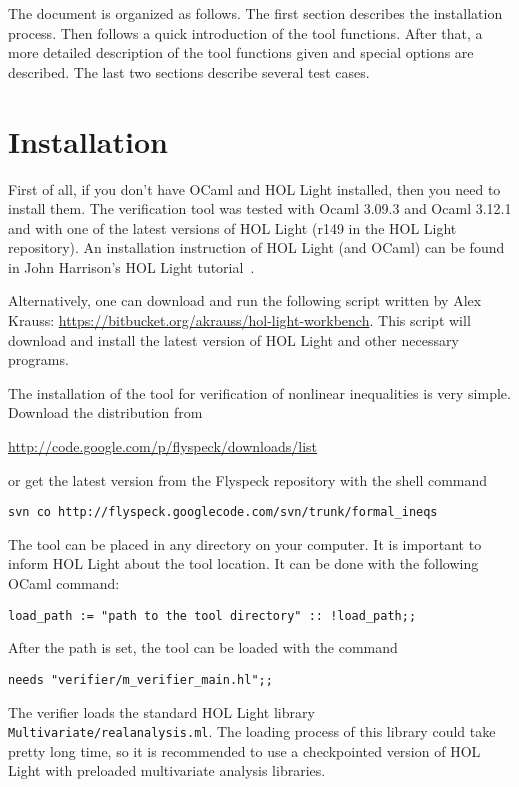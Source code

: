 \documentclass[a4paper]{article}
\begin{document}
The document is organized as follows. The first section describes the installation process. Then follows a quick introduction of the tool functions. After that, a more detailed description of the tool functions given and special options are described. The last two sections describe several test cases.


\section{Installation}
First of all, if you don't have OCaml and HOL Light installed, then you need to install them. The verification tool was tested with Ocaml 3.09.3 and Ocaml 3.12.1 and with one of the latest versions of HOL Light (r149 in the HOL Light repository).  An installation instruction of HOL Light (and OCaml) can be found in John Harrison's HOL Light tutorial~\cite{HOL-tutorial}.

Alternatively, one can download and run the following script written by Alex Krauss: \url{https://bitbucket.org/akrauss/hol-light-workbench}. This script will download and install the latest version of HOL Light and other necessary programs.

The installation of the tool for verification of nonlinear inequalities is very simple. Download the distribution from

\vspace{-5pt}
\url{http://code.google.com/p/flyspeck/downloads/list}

\vspace{-5pt}
or get the latest version from the Flyspeck repository with the shell command

\vspace{-5pt}
\verb|svn co http://flyspeck.googlecode.com/svn/trunk/formal_ineqs|


The tool can be placed in any directory on your computer. It is important to inform HOL Light about the tool location. It can be done with the following OCaml command:

\verb|load_path := "path to the tool directory" :: !load_path;;|

After the path is set, the tool can be loaded with the command

\verb|needs "verifier/m_verifier_main.hl";;|

The verifier loads the standard HOL Light library \verb|Multivariate/realanalysis.ml|. The loading process of this library could take pretty long time, so it is recommended to use a checkpointed version of HOL Light with preloaded multivariate analysis libraries.
\end{document}
